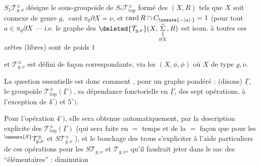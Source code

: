 $S_1\mathcal T_{g,\nu}^\pm$ désigne le sous-groupoïde de $S_*\mathcal T_{\mathrm{top}}^\pm$ formé des $(X,R)$ tels que $X$ soit connexe de genre $g$, $\operatorname{card}\pi_0\partial X=\nu$, et $\operatorname{card}R\cap C_{\unsure{-|a|\cdot}}=1$ (pour tout $a\in\pi_0\partial X$ --- i.e. le graphe  des
$\deleted{\mathcal T_{g,\nu}}(X,\underset{\substack{\Vert\\\partial X}}{\widetilde\Sigma},R)$ est isom. à
toutes ces arêtes (libres) sont de poids $1$

et $\mathcal T_{g,\nu}^\pm$ est défini de façon correspondante, via les $(X,\phi,\phi)$ où $X$ de type $g,\nu$.

La question essentielle est donc comment , pour un graphe  pondéré :
  (disons) $\underline\Gamma$, le
groupoïde $\mathcal T_{\mathrm{top}}^\pm(\underline\Gamma)$,
  sa dépendance fonctorielle en $\underline\Gamma$,
 
des sept opérations, à l'exception de $4^\circ)$ et $5^\circ)$.

Pour l'opération $4^\circ)$, elle sera obtenue automatiquement, par la description explicite des
$\mathcal T_{\mathrm{top}}^\pm(\underline\Gamma)$
(qui sera faite en $=$ temps et de la $=$ façon que pour les ${}^{\unsure{S}}\mathcal T_{g,\nu}^\pm$ et $S\mathcal T_{g,\nu}^\pm$ ),
et le bouchage des trous  s'expliciter à l'aide   particuliers de ces opérations pour les
$S\mathcal T_{g,\nu}$ et $\mathcal T_{g,\nu}$, qu'il faudrait jeter dans le sac des
  ``élémentaires'' : diminution

